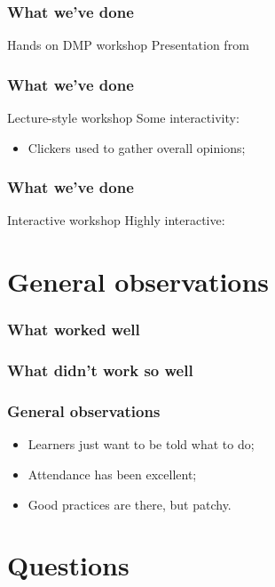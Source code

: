 \documentclass[handout]{beamer}
\begin{document}
\begin{frame}
  \frametitle{What we've done}
  
  \begin{block}{Hands on DMP workshop}
    Presentation from 
  \end{block}
\end{frame}

\begin{frame}
  \frametitle{What we've done}
  
  \begin{block}{Lecture-style workshop}
    Some interactivity:
    \begin{itemize}
      \item Clickers used to gather overall opinions;
    \end{itemize}
  \end{block}
\end{frame}

\begin{frame}
  \frametitle{What we've done}
  
  \begin{block}{Interactive workshop}
    Highly interactive:
  \end{block}
\end{frame}
\section{General observations}

\begin{frame}
  \frametitle{What worked well}
  

\end{frame}

\begin{frame}
  \frametitle{What didn't work so well}
  

\end{frame}

\begin{frame}
  \frametitle{General observations}
  
  \begin{itemize}
    \item Learners just want to be told what to do;
    \item Attendance has been excellent;
    \item Good practices are there, but patchy.
  \end{itemize}
\end{frame}

\section{Questions}
\end{document}
